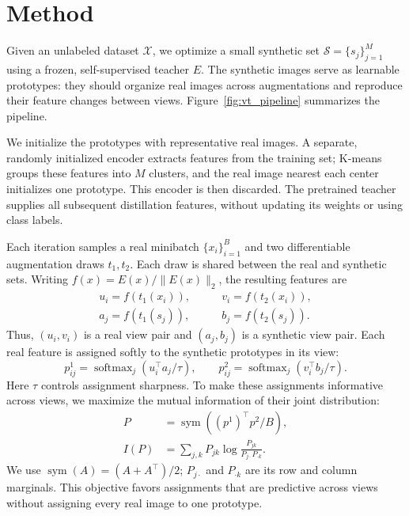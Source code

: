 \section{Method}
\label{sec:vt_method}

Given an unlabeled dataset $\mathcal{X}$, we optimize a small synthetic set
$\mathcal{S}=\{s_j\}_{j=1}^{M}$ using a frozen, self-supervised teacher $E$.
The synthetic images serve as learnable prototypes: they should organize real
images across augmentations and reproduce their feature changes between views.
Figure~\ref{fig:vt_pipeline} summarizes the pipeline.

We initialize the prototypes with representative real images. A separate,
randomly initialized encoder extracts features from the training set; K-means
groups these features into $M$ clusters, and the real image nearest each center
initializes one prototype. This encoder is then discarded. The pretrained
teacher supplies all subsequent distillation features, without updating its
weights or using class labels.

Each iteration samples a real minibatch $\{x_i\}_{i=1}^{B}$ and two
differentiable augmentation draws $t_1,t_2$. Each draw is shared between the real
and synthetic sets. Writing $f(x)=E(x)/\|E(x)\|_2$, the resulting features are
\begin{equation}
\begin{aligned}
 u_i=f(t_1(x_i)), &\qquad v_i=f(t_2(x_i)),\\
 a_j=f(t_1(s_j)), &\qquad b_j=f(t_2(s_j)).
\end{aligned}
\label{eq:vt_features}
\end{equation}
Thus, $(u_i,v_i)$ is a real view pair and $(a_j,b_j)$ is a synthetic view pair.
Each real feature is assigned softly to the synthetic prototypes in its view:
\begin{equation}
 p^1_{ij}=\operatorname{softmax}_{j}(u_i^\top a_j/\tau),\qquad
 p^2_{ij}=\operatorname{softmax}_{j}(v_i^\top b_j/\tau).
\label{eq:vt_assignments}
\end{equation}
Here $\tau$ controls assignment sharpness. To make these assignments informative
across views, we maximize the mutual information of their joint distribution:
\begin{equation}
\begin{aligned}
 P&=\operatorname{sym}\!\left((p^1)^\top p^2/B\right),\\
 I(P)&=\sum_{j,k}P_{jk}\log\frac{P_{jk}}{P_{j\cdot}P_{\cdot k}}.
\end{aligned}
\label{eq:vt_information}
\end{equation}
We use $\operatorname{sym}(A)=(A+A^\top)/2$; $P_{j\cdot}$ and $P_{\cdot k}$
are its row and column marginals. This objective favors assignments that are
predictive across views without assigning every real image to one prototype.

